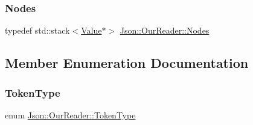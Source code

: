 \mbox{\label{classJson_1_1OurReader_a8480a5ef159cee3a090f96358414d8d3_a8480a5ef159cee3a090f96358414d8d3}} 
\subsubsection{\texorpdfstring{Nodes}{Nodes}}
{\footnotesize\ttfamily typedef std\+::stack$<$\hyperlink{classJson_1_1Value}{Value}$\ast$$>$ \hyperlink{classJson_1_1OurReader_a8480a5ef159cee3a090f96358414d8d3_a8480a5ef159cee3a090f96358414d8d3}{Json\+::\+Our\+Reader\+::\+Nodes}\hspace{0.3cm}{\ttfamily [private]}}



\subsection{Member Enumeration Documentation}
\mbox{\label{classJson_1_1OurReader_a15116f7276ddf1e7a2cc3cbefa884dcc_a15116f7276ddf1e7a2cc3cbefa884dcc}} 
\subsubsection{\texorpdfstring{Token\+Type}{TokenType}}
{\footnotesize\ttfamily enum \hyperlink{classJson_1_1OurReader_a15116f7276ddf1e7a2cc3cbefa884dcc_a15116f7276ddf1e7a2cc3cbefa884dcc}{Json\+::\+Our\+Reader\+::\+Token\+Type}\hspace{0.3cm}{\ttfamily [private]}}

